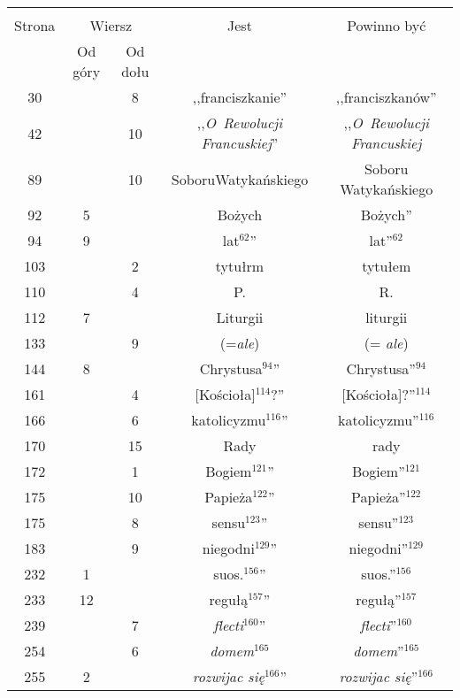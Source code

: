 \documentclass[a4paper,11pt]{article}
\begin{document}
\begin{center}
  \begin{tabular}{|c|c|c|c|c|}
    \hline
    & \multicolumn{2}{c|}{} & & \\
    Strona & \multicolumn{2}{c|}{Wiersz} & Jest
                              & Powinno być \\ \cline{2-3}
    & Od góry & Od dołu & & \\
    \hline
    30  & &  8 & ,,franciszkanie'' & ,,franciszkanów'' \\
    42  & & 10 & ,,\emph{O~Rewolucji Francuskiej}''
           & ,,\emph{O~Rewolucji Francuskiej} \\
    89  & & 10 & SoboruWatykańskiego & Soboru Watykańskiego \\
    92  &  5 & & Bożych & Bożych'' \\
    94  &  9 & & lat$^{ 62 }$'' & lat''$^{ 62 }$ \\
    103 & &  2 & tytułrm & tytułem \\
    110 & &  4 & P. & R. \\
    112 &  7 & & Liturgii & liturgii \\
    133 & &  9 & (=\emph{ale}) & (= \emph{ale}) \\
    144 &  8 & & Chrystusa$^{ 94 }$'' & Chrystusa''$^{ 94 }$\\
    161 & &  4 & [Kościoła]$^{ 114 }$?'' & [Kościoła]?''$^{ 114 }$ \\
    166 & &  6 & katolicyzmu$^{ 116 }$'' & katolicyzmu''$^{ 116 }$ \\
    170 & & 15 & Rady & rady \\
    172 & &  1 & Bogiem$^{ 121 }$'' & Bogiem''$^{ 121 }$ \\
    175 & & 10 & Papieża$^{ 122 }$'' & Papieża''$^{ 122 }$ \\
    175 & &  8 & sensu$^{ 123 }$'' & sensu''$^{ 123 }$ \\
    183 & &  9 & niegodni$^{ 129 }$'' & niegodni''$^{ 129 }$ \\
    232 &  1 & & suos.$^{ 156 }$'' & suos.''$^{ 156 }$ \\
    233 & 12 & & regułą$^{ 157 }$'' & regułą''$^{ 157 }$ \\
    239 & &  7 & \emph{flecti}$^{ 160 }$'' & \emph{flecti}''$^{ 160 }$ \\
    254 & &  6 & \emph{domem}$^{ 165 }$ & \emph{domem}''$^{ 165 }$ \\
    255 &  2 & & \emph{rozwijac się}$^{ 166 }$''
           & \emph{rozwijac się}''$^{ 166 }$ \\

\end{tabular}
\end{center}
\end{document}
